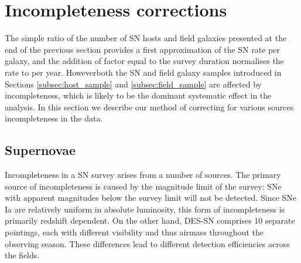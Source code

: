 \documentclass[fleqn,usenatbib]{mnras}
\providecommand{\DIFadd}[1]{{\protect\color{blue}\uwave{#1}}} %
\providecommand{\DIFaddbegin}{} %
\providecommand{\DIFaddend}{} %
\newcommand{\DIFaddincludegraphics}[2][]{{\color{blue}\fbox{\DIFOincludegraphics[#1]{#2}}}} %
\DeclareRobustCommand{\DIFaddbegin}{\DIFOaddbegin \let\includegraphics\DIFaddincludegraphics} %
\DeclareRobustCommand{\DIFaddend}{\DIFOaddend \let\includegraphics\DIFOincludegraphics} %
\begin{document}
\section{Incompleteness corrections}
\label{sec:incompleteness}
The simple ratio of the number of SN hosts and field galaxies presented at the end of the previous section provides a first approximation of the SN rate per galaxy, and the addition of \DIFaddbegin \DIFadd{a }\DIFaddend factor equal to the survey duration normalises the rate to per year. However\DIFaddbegin \DIFadd{, }\DIFaddend both the SN and field galaxy samples introduced in Sections \ref{subsec:host_sample} and \ref{subsec:field_sample} are affected by incompleteness, which is likely to be the dominant systematic effect in the analysis. In this section we describe our method of correcting for various sources \DIFaddbegin \DIFadd{of }\DIFaddend incompleteness in the data.

\subsection{Supernovae \label{subsec:incompleteness_SNe}}

Incompleteness in a SN survey arises from a number of sources. The primary source of incompleteness is caused by the magnitude limit of the survey: SNe with apparent magnitudes below the survey limit will not be detected. Since SNe Ia are relatively uniform in absolute luminosity, this form of incompleteness is primarily redshift dependent. On the other hand, DES-SN comprises 10 separate pointings, each with different visibility and thus airmass throughout the observing season. These differences lead to different detection efficiencies across the fields.
\end{document}
